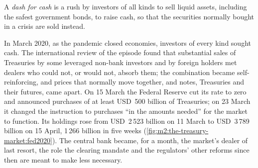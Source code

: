 \begin{omfigure}

\label{fig:m2:the-treasury-market:oct2014}
\end{omfigure}

\begin{definition}\label{def:m2:the-treasury-market:dash}
A \emph{dash for cash} is a rush by investors of all
kinds to sell liquid assets, including the safest government bonds, to raise
cash, so that the securities normally bought in a crisis are sold instead.
\end{definition}

In March 2020, as the pandemic closed economies, investors of every kind
sought cash. The international review of the episode found that substantial
sales of Treasuries by some leveraged non-bank investors and by foreign
holders met dealers who could not, or would not, absorb them; the combination
became self-reinforcing, and prices that normally move together, 
and  notes, Treasuries and their futures, came apart. On 15 March the Federal Reserve cut its rate to zero
and announced purchases of at least USD~500 billion of Treasuries; on 23 March
it changed the instruction to purchases ``in the amounts needed'' for the
market to function. Its holdings rose from USD~2\,523 billion on 11 March to
USD~3\,789 billion on 15 April, 1\,266 billion in five weeks
(\cref{fig:m2:the-treasury-market:fed2020}). The central bank became, for a
month, the market's dealer of last resort, the role the clearing mandate and
the regulators' other reforms since then are meant to make less necessary.

